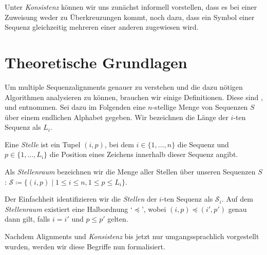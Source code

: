 Unter \emph{Konsistenz} können wir uns zunächst informell vorstellen, dass es bei einer Zuweisung weder zu Überkreuzungen kommt, noch dazu, dass ein Symbol einer Sequenz gleichzeitig mehreren einer anderen zugewiesen wird.

\section{Theoretische Grundlagen}\label{sec:theo}

Um multiple Sequenzalignments genauer zu verstehen und die dazu nötigen Algorithmen analysieren zu können, brauchen wir einige Definitionen. Diese sind \cite{mdw96}, \cite{am00} und \cite{cpm10} entnommen. Sei dazu im Folgenden eine $n$-stellige Menge von Sequenzen $S$ über einem endlichen Alphabet gegeben. Wir bezeichnen die Länge der $i$-ten Sequenz als $L_i$.

\begin{definition}
	Eine \emph{Stelle} ist ein Tupel $(i,p)$, bei dem $i \in \{1,\dots,n\}$ die Sequenz und $p\in \{1,\dots,L_i\}$ die Position eines Zeichens innerhalb dieser Sequenz angibt. 
	
	\noindent Als \emph{Stellenraum} bezeichnen wir die Menge aller Stellen über unseren Sequenzen $S$: $\mathcal{S} \coloneqq \{(i,p)\mid 1 \leq i \leq n, 1 \leq p \leq L_i \}$.
	
	\noindent Der Einfachheit identifizieren wir die \emph{Stellen} der $i$-ten Sequenz als $\mathcal{S}_i$. Auf dem \emph{Stellenraum} existiert eine Halbordnung `$\preceq$', wobei $(i,p) \preceq (i',p')$ genau dann gilt, falls $i=i'$ und $p\leq p'$ gelten.
\end{definition}

Nachdem Alignments und \emph{Konsistenz} bis jetzt nur umgangssprachlich vorgestellt wurden, werden wir diese Begriffe nun formalisiert.

